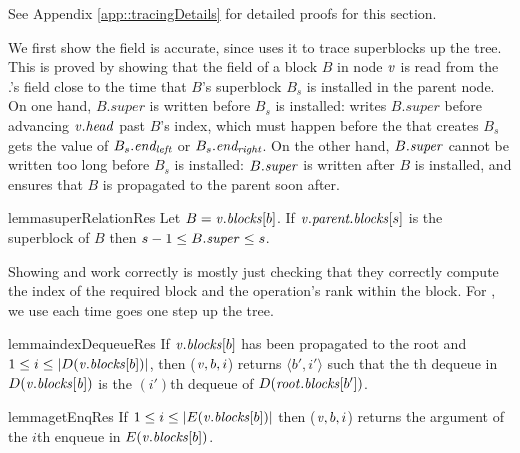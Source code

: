 See Appendix \ref{app::tracingDetails} for detailed proofs for this section.

We first show the  field is accurate, since  uses it to trace superblocks up the tree.  This is proved by showing that the  field of a block $B$ in node $\mbox{\textnormal{\textit{v}}}$ is read from the 
.'s  field close to the time that $B$'s superblock $B_s$ is installed in the parent node.
On one hand, $B.super$ is written before $B_s$ is installed:
 writes $B.super$ before advancing $\mbox{\textnormal{\textit{v}}}.\mbox{\textit{head}}$  past $B$'s index, which must happen before the  that creates
$B_s$ gets the value of $B_s.\mbox{\textit{end\textsubscript{left}}}$ or $B_s.\mbox{\textit{end\textsubscript{right}}}$.
On the other hand, $B.\mbox{\textit{super}}$ cannot be written too long before $B_s$ is installed:
$B.\mbox{\textit{super}}$ is written after $B$ is installed, and  ensures that $B$ is propagated to the
parent soon after.

\begin{restatable}{lemma}{superRelationRes}
\label{superRelation}
Let $B=\mbox{\textnormal{\textit{v}}}.\mbox{\textnormal{\textit{blocks}}}[b]$.
  If $\mbox{\textnormal{\textit{v}}}.\mbox{\textit{parent.blocks}}[s]$ is the superblock of $B$ then $s-1\leq B.\mbox{\textit{super}}\leq s$.
\end{restatable}


Showing   and  work correctly is mostly just checking that they correctly compute the index of the required block
and the operation's rank within the block.  
For , we use  each time  goes one step up the tree.

\begin{restatable}{lemma}{indexDequeueRes}
\label{lem::indexDequeue}
If $\mbox{\textnormal{\textit{v}}}.\mbox{\textit{blocks}}[b]$ has been propagated to the root and $1\leq i\leq |D(\mbox{\textnormal{\textit{v}}}.\mbox{\textit{blocks}}[b])|$, 
 then ($\mbox{\textnormal{\textit{v}}}, b, i$) returns $\langle b',i' \rangle$ such that the th dequeue in $D(\mbox{\textnormal{\textit{v}}}.\mbox{\textit{blocks}}[\mbox{\textnormal{\textit{b}}}])$ is the $(i')$th dequeue of $D(\mbox{\textnormal{\textit{root}}}.\mbox{\textit{blocks}}[b'])$.
\end{restatable}

\begin{restatable}{lemma}{getEnqRes}
\label{lem::get}
If $1\leq i\leq |E(\mbox{\textnormal{\textit{v}}}.\mbox{\textit{blocks}}[b])|$ then ($\mbox{\textnormal{\textit{v}}},b,i$) returns the argument of the $i$th enqueue in $E(\mbox{\textnormal{\textit{v}}}.\mbox{\textit{blocks}}[b])$.
\end{restatable}

